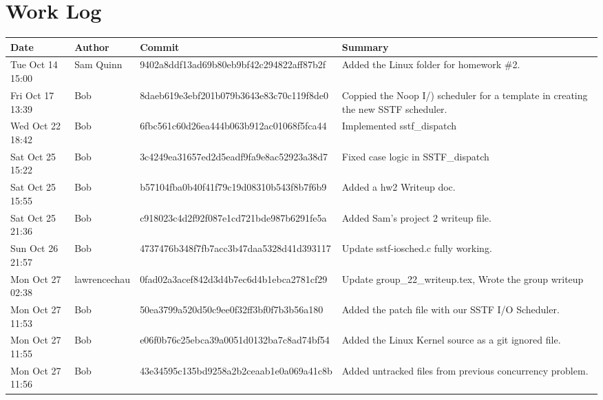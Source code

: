\documentclass[letterpaper,10pt,notitlepage,fleqn]{article}
\begin{document}
\section*{Work Log}

\begin{center}
    \begin{tabular}{| p{3cm} | l | l | p{5cm} |}
        \hline
        Date & Author & Commit & Summary \\ \hline
        Tue Oct 14 15:00 & Sam Quinn & 9402a8ddf13ad69b80eb9bf42c294822aff87b2f & Added the Linux folder for homework \#2.
        \\ \hline
        Fri Oct 17 13:39 & Bob & 8daeb619e3ebf201b079b3643e83c70c119f8de0 & Coppied the Noop I/) scheduler for a template in creating the new SSTF scheduler.
        \\ \hline
        Wed Oct 22 18:42 & Bob & 6fbc561c60d26ea444b063b912ac01068f5fca44 & Implemented sstf\_dispatch
        \\ \hline
        Sat Oct 25 15:22 & Bob & 3c4249ea31657ed2d5eadf9fa9e8ac52923a38d7 & Fixed case logic in SSTF\_dispatch
        \\ \hline
        Sat Oct 25 15:55 & Bob & b57104fba0b40f41f79c19d08310b543f8b7f6b9 & Added a hw2 Writeup doc.
        \\ \hline
        Sat Oct 25 21:36 & Bob & c918023c4d2f92f087e1cd721bde987b6291fe5a & Added Sam's project 2 writeup file.
        \\ \hline
        Sun Oct 26 21:57 & Bob & 4737476b348f7fb7acc3b47daa5328d41d393117 & Update sstf-iosched.c fully working.
        \\ \hline
        Mon Oct 27 02:38 & lawrencechau & 0fad02a3acef842d3d4b7ec6d4b1ebca2781cf29 & Update group\_22\_writeup.tex, Wrote the group writeup
        \\ \hline
        Mon Oct 27 11:53 & Bob & 50ea3799a520d50c9ee0f32ff3bf0f7b3b56a180 & Added the patch file with our SSTF I/O Scheduler.
        \\ \hline
        Mon Oct 27 11:55 & Bob & e06f0b76c25ebca39a0051d0132ba7c8ad74bf54 & Added the Linux Kernel source as a git ignored file.
        \\ \hline
        Mon Oct 27 11:56 & Bob & 43e34595c135bd9258a2b2ceaab1e0a069a41c8b & Added untracked files from previous concurrency problem.
        \\ \hline
    \end{tabular}
\end{center}
\end{document}
